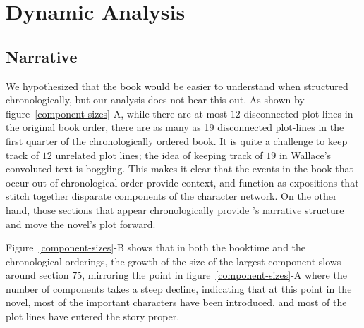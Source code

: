 \section{Dynamic Analysis}

\subsection{Narrative}

We hypothesized that the book would be easier to understand when structured chronologically, but our analysis does not bear this out. As shown by figure~\ref{component-sizes}-A, while there are at most $12$ disconnected plot-lines in the original book order, there are as many as 19 disconnected plot-lines in the first quarter of the chronologically ordered book. It is quite a challenge to keep track of $12$ unrelated plot lines; the idea of keeping track of $19$ in Wallace's convoluted text is boggling. This makes it clear that the events in the book that occur out of chronological order provide context, and function as expositions that stitch together disparate components of the character network. On the other hand, those sections that appear chronologically provide \infinitejest's narrative structure and move the novel's plot forward.

Figure~\ref{component-sizes}-B shows that in both the booktime and the chronological orderings, the growth of the size of the largest component slows around section 75, mirroring the point in figure~\ref{component-sizes}-A where the number of components takes a steep decline, indicating that at this point in the novel, most of the important characters have been introduced, and most of the plot lines have entered the story proper.

